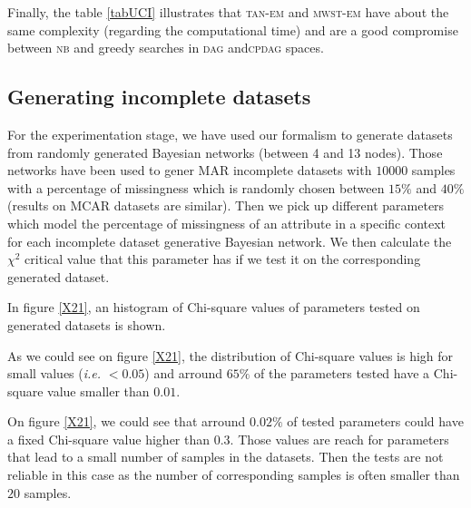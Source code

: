 Finally, the table \ref{tabUCI} illustrates that \textsc{tan-em} and \textsc{mwst-em} have about the same complexity (regarding the computational time) and are a good compromise between \textsc{nb} and greedy searches in \textsc{dag} and\textsc{cpdag} spaces.

\subsection{Generating incomplete datasets}

For the experimentation stage, we have used our formalism to generate
datasets from randomly generated Bayesian networks (between 4 and 13
nodes).
Those networks have been used to gener MAR incomplete
datasets with $10000$ samples with a percentage of missingness which is randomly chosen
between $15\%$ and $40\%$ (results on MCAR datasets are similar).
Then we pick up different parameters which model the
percentage of missingness of an attribute in a specific context for
each incomplete dataset generative Bayesian network.
We then calculate the $\chi^2$ critical value that
this parameter has if we test it on the corresponding generated dataset.

In figure \ref{X21}, an histogram of Chi-square values of parameters
tested on generated datasets is shown.

As we could see on figure \ref{X21}, the distribution
of Chi-square values is high for small values (\emph{i.e.} $<0.05$)
and arround $65\%$ of the parameters tested have a Chi-square value
smaller than $0.01$.

On figure \ref{X21}, we could see that arround $0.02\%$ of tested
parameters could have a fixed Chi-square value higher than $0.3$.
Those values are reach for parameters that lead to a small number of
samples in the datasets.
Then the tests are not reliable in this case as the number of
corresponding samples is often smaller than $20$ samples.



